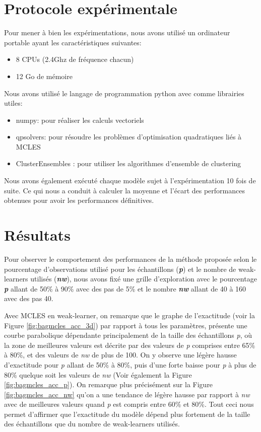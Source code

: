  \section{Protocole expérimentale}

    Pour mener à bien les expérimentations, nous avons utilisé un ordinateur portable ayant les caractéristiques suivantes:
	\begin{itemize}
  	  \item 8 CPUs (2.4Ghz de fréquence chacun)
  	  \item 12 Go de mémoire
	\end{itemize}

    Nous avons utilisé le langage de programmation {python} avec comme librairies utiles:
    \begin{itemize}
   	 \item numpy: pour réaliser les calculs vectoriels
   	 \item qpsolvers: pour résoudre les problèmes d'optimisation quadratiques liés à MCLES
   	 \item ClusterEnsembles : pour utiliser les algorithmes d'ensemble de clustering
    \end{itemize}

    Nous avons également exécuté chaque modèle sujet à l'expérimentation 10 fois de suite. Ce qui nous a conduit à calculer la moyenne et l'écart des performances obtenues pour avoir les performances définitives.
    
\section{Résultats}

	Pour observer le comportement des performances de la méthode proposée selon le pourcentage d'observations utilisé pour les échantillons (\textbf{\textit{p}}) et le nombre de weak-learners utilisés (\textbf{\textit{nw}}), nous avons fixé une grille d'exploration avec le pourcentage \textbf{\textit{p}} allant de 50\% à 90\% avec des pas de 5\% et le nombre \textbf{\textit{nw}} allant de 40 à 160 avec des pas 40.

    Avec MCLES en weak-learner, on remarque que le graphe de l'exactitude (voir la Figure \ref{fig:bagmcles_acc_3d}) par rapport à tous les paramètres, présente une courbe parabolique dépendante principalement de la taille des échantillons \textit{p}, où la zone de meilleures valeurs est décrite par des valeurs de \textit{p} comprises entre 65\% à 80\%, et des valeurs de \textit{nw} de plus de 100.
    On y observe une légère hausse d'exactitude pour \textit{p} allant de 50\% à 80\%, puis d'une forte baisse pour \textit{p} à plus de 80\% quelque soit les valeurs de \textit{nw} (Voir également la Figure \ref{fig:bagmcles_acc_p}).
    On remarque plus précisément sur la Figure \ref{fig:bagmcles_acc_nw} qu'on a une tendance de légère hausse par rapport à \textit{nw} avec de meilleures valeurs quand \textit{p} est compris entre 60\% et 80\%.
    Tout ceci nous permet d'affirmer que l'exactitude du modèle dépend plus fortement de la taille des échantillons que du nombre de weak-learners utilisés.

